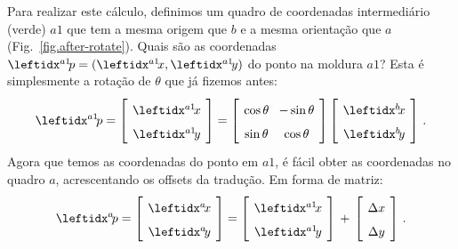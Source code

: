 Para realizar este cálculo, definimos um quadro de coordenadas intermediário (verde) $a1$ que tem a mesma origem que $b$ e a mesma orientação que $a$ (Fig.~\ref{fig.after-rotate}). Quais são as coordenadas $\aprimep=(\aprimex,\aprimey)$ do ponto na moldura $a1$? Esta é simplesmente a rotação de $\theta$ que já fizemos antes:
\[
\spacearray
\aprimep=\left[\begin{array}{c}\aprimex\\\aprimey\end{array}\right]=
\left[\begin{array}{cc}\cos\theta&-\sin\theta\\\sin\theta&\cos\theta\end{array}\right]
\left[\begin{array}{c}\bx\\\by\end{array}\right]\,.
\]
Agora que temos as coordenadas do ponto em $a1$, é fácil obter as coordenadas no quadro $a$, acrescentando os offsets da tradução. Em forma de matriz:
\[
\spacearray
\ap=\left[\begin{array}{c}\ax\\\ay\end{array}\right]=
\left[\begin{array}{c}\aprimex\\\aprimey\end{array}\right]\,+\,
\left[\begin{array}{c}\Delta x\\\Delta y\end{array}\right]\,.
\]

